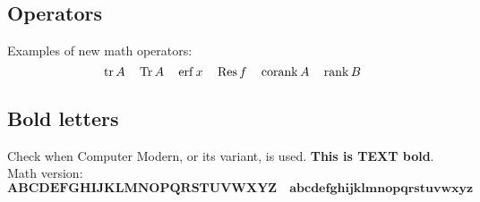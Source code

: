\documentclass[10pt,oneside,article]{memoir}
\begin{document}
\subsection{Operators}

Examples of new math operators:
\begin{equation}
  \operatorname{tr}{A}\quad \operatorname{Tr}{A}\quad \operatorname{erf}{x}\quad \operatorname{Res}{f}\quad \operatorname{corank}{A}\quad \operatorname{rank}{B}
\end{equation}

\subsection{Bold letters}

Check when Computer Modern, or its variant, is used. \textbf{This is TEXT bold}.  Math version:
\begin{equation}
  \mathbf{ABCDEFGHIJKLMNOPQRSTUVWXYZ}\quad \mathbf{abcdefghijklmnopqrstuvwxyz}
\end{equation}
\end{document}
